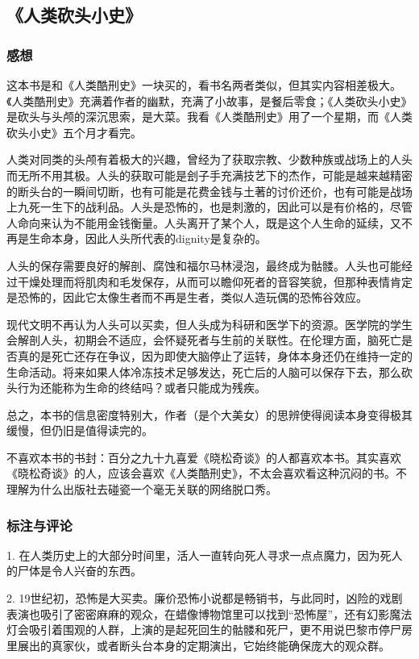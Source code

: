 \subsection{《人类砍头小史》}

\subsubsection{感想}
这本书是和《人类酷刑史》一块买的，看书名两者类似，但其实内容相差极大。《人类酷刑史》充满着作者的幽默，充满了小故事，是餐后零食；《人类砍头小史》是砍头与头颅的深沉思索，是大菜。我看《人类酷刑史》用了一个星期，而《人类砍头小史》五个月才看完。

人类对同类的头颅有着极大的兴趣，曾经为了获取宗教、少数种族或战场上的人头而无所不用其极。人头的获取可能是刽子手充满技艺下的杰作，可能是越来越精密的断头台的一瞬间切断，也有可能是花费金钱与土著的讨价还价，也有可能是战场上九死一生下的战利品。人头是恐怖的，也是刺激的，因此可以是有价格的，尽管人命向来认为不能用金钱衡量。人头离开了某个人，既是这个人生命的延续，又不再是生命本身，因此人头所代表的dignity是复杂的。

人头的保存需要良好的解剖、腐蚀和福尔马林浸泡，最终成为骷髅。人头也可能经过干燥处理而将肌肉和毛发保存，从而可以瞻仰死者的音容笑貌，但那种表情肯定是恐怖的，因此它太像生者而不再是生者，类似人造玩偶的恐怖谷效应。

现代文明不再认为人头可以买卖，但人头成为科研和医学下的资源。医学院的学生会解剖人头，初期会不适应，会怀疑死者与生前的关联性。在伦理方面，脑死亡是否真的是死亡还存在争议，因为即使大脑停止了运转，身体本身还仍在维持一定的生命活动。将来如果人体冷冻技术足够发达，死亡后的人脑可以保存下去，那么砍头行为还能称为生命的终结吗？或者只能成为残疾。

总之，本书的信息密度特别大，作者（是个大美女）的思辨使得阅读本身变得极其缓慢，但仍旧是值得读完的。

不喜欢本书的书封：百分之九十九喜爱《晓松奇谈》的人都喜欢本书。其实喜欢《晓松奇谈》的人，应该会喜欢《人类酷刑史》，不太会喜欢看这种沉闷的书。不理解为什么出版社去碰瓷一个毫无关联的网络脱口秀。

\subsubsection{标注与评论}
1. 在人类历史上的大部分时间里，活人一直转向死人寻求一点点魔力，因为死人的尸体是令人兴奋的东西。

2. 19世纪初，恐怖是大买卖。廉价恐怖小说都是畅销书，与此同时，凶险的戏剧表演也吸引了密密麻麻的观众，在蜡像博物馆里可以找到“恐怖屋”，还有幻影魔法灯会吸引着围观的人群，上演的是起死回生的骷髅和死尸，更不用说巴黎市停尸房里展出的真家伙，或者断头台本身的定期演出，它始终能确保庞大的观众群。

